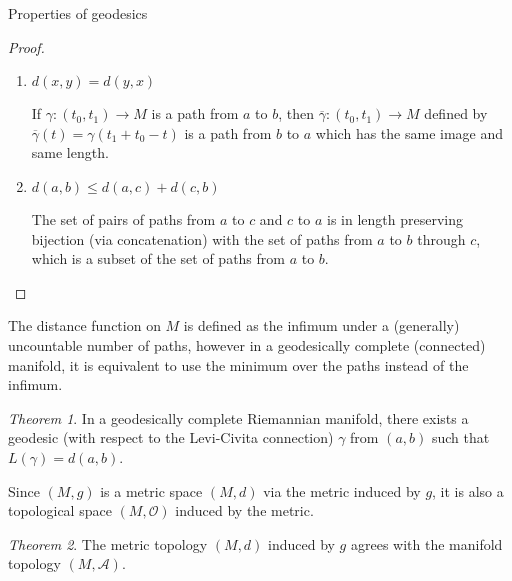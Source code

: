 \documentclass{article}
\newcommand{\fn}[3]{#1 \colon #2 \rightarrow #3}
\theoremstyle{definition}
\theoremstyle{remark}
\newtheorem{theorem}{Theorem}[section]
\begin{document}
\begin{section}{Properties of geodesics}
\begin{proof}
\begin{enumerate}
      The other direction is much simpler. If $a = b$, the constant path
      $\gamma(t) = a = b$ has length $0$, and the length of a path is strictly
      non-negative because $g$ is positive definite.
      \item $d(x, y) = d(y, x)$

      If $\fn\gamma {(t_0, t_1)} M$ is a path from $a$ to $b$, then
      $\fn{\overline\gamma} {(t_0, t_1)} M$ defined by
      $\overline\gamma(t) = \gamma(t_1 + t_0 - t)$ is a path from $b$ to $a$
      which has the same image and same length.
      \item $d(a, b) \leq d(a, c) + d(c, b)$

      The set of pairs of paths from $a$ to $c$ and $c$ to $a$
      is in length preserving bijection (via concatenation) with
      the set of paths from $a$ to $b$ through $c$,
      which is a subset of
      the set of paths from $a$ to $b$.
    \end{enumerate}
  \end{proof}

  The distance function on $M$ is defined as the infimum under a (generally)
  uncountable number of paths, however in a geodesically complete (connected)
  manifold, it is equivalent to use the minimum over the paths instead of the
  infimum.
  \begin{theorem}
    In a geodesically complete Riemannian manifold, there exists a geodesic
    (with respect to the Levi-Civita connection) $\gamma$ from $(a, b)$ such
    that $L(\gamma) = d(a, b)$.
  \end{theorem}

  Since $(M,g)$ is a metric space $(M, d)$ via the metric induced by $g$, it is
  also a topological space $(M, \mathcal O)$ induced by the metric.
  \begin{theorem} %
    The metric topology $(M, d)$ induced by $g$ agrees with the manifold
    topology $(M, \mathcal A)$.
  \end{theorem}
\end{section}
\end{document}
